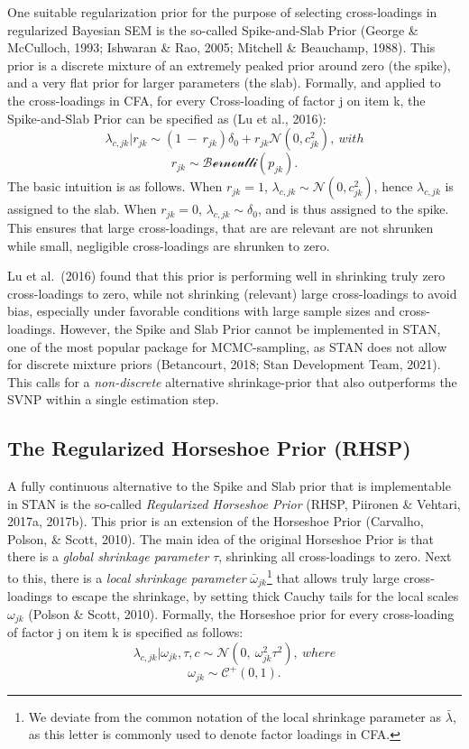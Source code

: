 \documentclass[
  man, donotrepeattitle,floatsintext]{apa6}
\begin{document}
One suitable regularization prior for the purpose of selecting cross-loadings in
regularized Bayesian SEM is the so-called Spike-and-Slab Prior (George \& McCulloch, 1993; Ishwaran \& Rao, 2005; Mitchell \& Beauchamp, 1988). This prior is a discrete mixture of an extremely peaked prior around zero (the spike), and a very flat prior for larger parameters (the slab). Formally, and applied to the cross-loadings in CFA, for every Cross-loading of factor j
on item k, the Spike-and-Slab Prior can be specified as (Lu et al., 2016):
\[\lambda_{c,jk} |r_{jk} \sim (1 \ - \ r_{jk})\delta_0 + r_{jk} \mathcal{N}(0, c^2_{jk}) , \ with\]
\[r_{jk} \sim \mathcal{Bernoulli}(p_{jk}).\]
The basic intuition is as follows. When \(r_{jk} = 1\), \(\lambda_{c,jk} \sim \mathcal{N}(0, c^2_{jk})\), hence \(\lambda_{c,jk}\) is assigned to the slab. When \(r_{jk} = 0\), \(\lambda_{c,jk} \sim \delta_0\), and is thus assigned to the spike. This ensures that large cross-loadings, that are are relevant are not shrunken while small, negligible cross-loadings are shrunken to zero.

Lu et al.~(2016) found that this prior is performing well in shrinking truly zero cross-loadings to zero, while not shrinking (relevant) large cross-loadings to avoid bias, especially under favorable conditions with large sample sizes and cross-loadings. However, the Spike and Slab Prior cannot be implemented in STAN, one of the most popular package for MCMC-sampling, as STAN does not allow for discrete mixture priors (Betancourt, 2018; Stan Development Team, 2021). This calls for a \emph{non-discrete} alternative shrinkage-prior that also outperforms the SVNP within a single estimation step.

\hypertarget{the-regularized-horseshoe-prior-rhsp}{%
\subsection{The Regularized Horseshoe Prior (RHSP)}\label{the-regularized-horseshoe-prior-rhsp}}

A fully continuous alternative to the Spike and Slab prior that is implementable in STAN is the so-called \emph{Regularized Horseshoe Prior} (RHSP, Piironen \& Vehtari, 2017a, 2017b). This prior is an extension of the Horseshoe Prior (Carvalho, Polson, \& Scott, 2010). The main idea of the original Horseshoe Prior is that there is a \emph{global shrinkage parameter} \(\tau\), shrinking all cross-loadings to zero. Next to this, there is a \emph{local shrinkage parameter} \(\bar{\omega}_{jk}\)\footnote{We deviate from the common notation of the local shrinkage parameter as \(\bar{\lambda}\), as this letter is commonly used to denote factor loadings in CFA.} that allows truly large cross-loadings to escape the shrinkage, by setting thick Cauchy tails for the local scales \(\omega_{jk}\) (Polson \& Scott, 2010). Formally, the Horseshoe prior for every cross-loading of factor j on item k is specified as follows:
\[\lambda_{c,jk} | \omega_{jk}, \tau, c\sim \mathcal{N}(0, \ \omega^2_{jk} \tau^2), \ where\]
\[\omega_{jk} \sim \mathcal{C^+}(0, 1).\]
\end{document}
